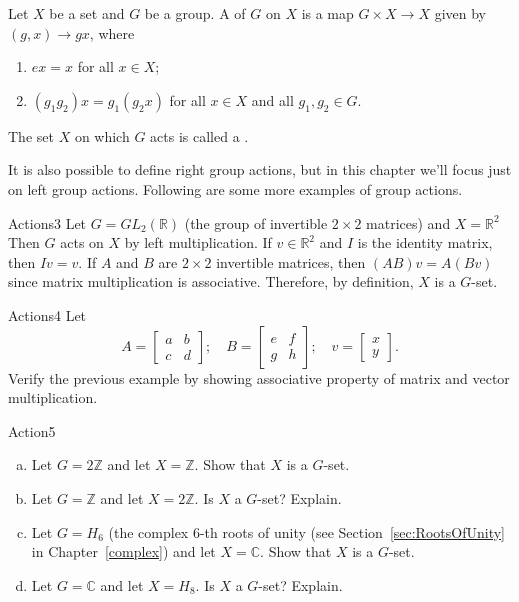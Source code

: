 \begin{defn}
Let $X$ be a set and $G$ be a group. A  of $G$ on $X$ is a map $G\times X\rightarrow X$
given by $(g, x)\rightarrow gx$, where
\begin{enumerate}[(1)]
\item $ex = x$ for all $x\in X$;
\item $(g_1g_2)x = g_1(g_2x)$ for all $x\in X$ and all $g_1, g_2 \in G$.
\end{enumerate}
The set $X$  on which $G$ acts is called a  .
\end{defn}
It is also possible to define right group actions, but in this chapter we'll focus just on left group actions.  Following are some more examples of group actions.

\begin{example}{Actions3}
 Let $G = GL_2(\mathbb{R})$ (the group of invertible $2 \times 2$ matrices) and $X = \mathbb{R}^2$
Then $G$ acts on $X$ by left multiplication. If $v\in \mathbb{ R}^2$
and $I$ is the identity matrix, then $Iv = v$. If $A$ and $B$ are $2 \times 2$
invertible matrices, then $(AB)v = A(Bv)$ since matrix multiplication is associative.  Therefore, by definition, $X$ is a $G$-set.\end{example}

\begin {exercise}{Actions4}
Let
\begin{equation*}
A=\left[\begin {array}{cc}
a&b\\c&d\end{array}\right]; \quad 
B=\left[\begin{array}{cc} e& f\\ g & h\end{array}\right]; \quad 
v=\left[\begin{array}{c}x\\ y\end{array}\right].
\end{equation*}
Verify the previous example by showing associative property of matrix and vector multiplication. 
\end {exercise}

\begin{exercise}{Action5}
\begin{enumerate}[(a)]
\item 
Let $G = 2\mathbb{Z}$ and let $X =\mathbb{Z}$. Show that $X$ is a $G$-set.
\item Let $G = \mathbb{Z}$ and let $X = 2\mathbb{Z}$. Is $X$ a $G$-set? Explain.
\item Let $G = H_6$ (the complex $6$-th roots of unity (see Section~\ref{sec:RootsOfUnity} in Chapter~\ref{complex}) and let $X =\mathbb{C}$. Show that $X$ is a $G$-set.
\item Let $G = \mathbb{C}$ and let $X = H_8$.  Is $X$ a $G$-set? Explain.
\end{enumerate}
\end{exercise}
